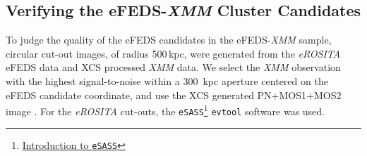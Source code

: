 \documentclass[fleqn,usenatbib]{mnras}
\begin{document}
\subsection{Verifying the eFEDS-{\em XMM} Cluster Candidates}
\label{sec:efeds-verification}





To judge the quality of the eFEDS candidates in the 
eFEDS-{\em XMM} sample, circular cut-out images, of radius 500\,kpc, were generated from the {\em eROSITA} eFEDS data and XCS processed {\em XMM} data. We select the {\em XMM} observation with the highest signal-to-noise within a 300~kpc aperture centered on the eFEDS candidate coordinate, and use the XCS generated PN+MOS1+MOS2 image \citep[][]{xcsgiles}. For the {\em eROSITA} cut-outs, the \texttt{eSASS}\footnote{\href{https://erosita.mpe.mpg.de/edr/DataAnalysis/}{Introduction to \texttt{eSASS}}} \texttt{evtool} software was used. 
\end{document}

